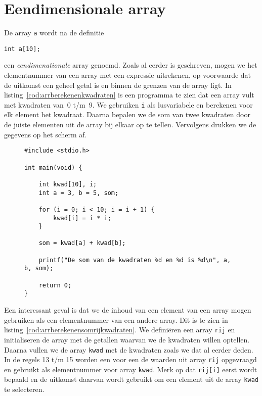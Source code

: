 \section{Eendimensionale array}
De array \texttt{a} wordt na de definitie

\begin{lstlisting}[style=lstoneline]
int a[10];
\end{lstlisting}

een \textsl{eendimenationale} array genoemd.
Zoals al eerder is geschreven, mogen we het elementnummer van een array met een expressie uitrekenen, op voorwaarde dat de uitkomst een geheel getal is en binnen de grenzen van de array ligt. In listing~\ref{cod:arrberekenenkwadraten} is een programma te zien dat een array vult met kwadraten van~0 t/m~9. We gebruiken \texttt{i} als lusvariabele en berekenen voor elk element het kwadraat. Daarna bepalen we de som van twee kwadraten door de juiste elementen uit de array bij elkaar op te tellen. Vervolgens drukken we de gegevens op het scherm af.

\begin{figure}[!ht]
\begin{lstlisting}[caption=Afdrukken van de som van twee kwadraten.,label=cod:arrberekenenkwadraten]
#include <stdio.h>

int main(void) {

    int kwad[10], i;
    int a = 3, b = 5, som;

    for (i = 0; i < 10; i = i + 1) {
        kwad[i] = i * i;
    }

    som = kwad[a] + kwad[b];

    printf("De som van de kwadraten %d en %d is %d\n", a, b, som);

    return 0;
}
\end{lstlisting}
\end{figure}

Een interessant geval is dat we de inhoud van een element van een array mogen gebruiken als een elementnummer van een andere array. Dit is te zien in listing~\ref{cod:arrberekenensomrijkwadraten}. We definiëren een array \texttt{rij} en initialiseren de array met de getallen waarvan we de kwadraten willen optellen. Daarna vullen we de array \texttt{kwad} met de kwadraten zoals we dat al eerder deden. In de regels 13 t/m 15 worden een voor een de waarden uit array \texttt{rij} opgevraagd en gebruikt als elementnummer voor array \texttt{kwad}. Merk op dat \texttt{rij[i]} eerst wordt bepaald en de uitkomst daarvan wordt gebruikt om een element uit de array \texttt{kwad} te selecteren.

